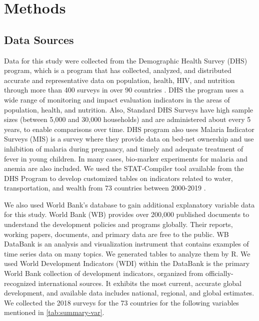 \documentclass[10pt,twoside]{article}
\numberwithin{equation}{section}
\newcommand{\?}{\stackrel{?}{=}}
\begin{document}
\section{Methods}
\subsection{Data Sources}
Data for this study were collected from the Demographic Health Survey (DHS) program, which is a program that has collected, analyzed, and distributed accurate and representative data on population, health, HIV, and nutrition through more than 400 surveys in over 90 countries \citep{statcompiler}. DHS the program uses a wide range of monitoring and impact evaluation indicators in the areas of population, health, and nutrition. Also, Standard DHS Surveys have high sample sizes (between 5,000 and 30,000 households) and are administered about every 5 years, to enable comparisons over time. DHS program also uses Malaria Indicator Surveys (MIS) is a survey where they provide data on bed-net ownership and use inhibition of malaria during pregnancy, and timely and adequate treatment of fever in young children. In many cases, bio-marker experiments for malaria and anemia are also included. We used the STAT-Compiler tool available from the DHS Program to develop customized tables on indicators related to water, transportation, and wealth from 73 countries between 2000-2019 \citep{statcompiler}.

We also used World Bank's database to gain additional explanatory variable data for this study. World Bank (WB) provides over 200,000 published documents to understand the development policies and programs globally. Their reports, working papers, documents, and primary data are free to the public. WB DataBank is an analysis and visualization instrument that contains examples of time series data on many topics. We generated tables to analyze them by R.  We used World Development Indicators (WDI) within the DataBank is the primary World Bank collection of development indicators, organized from officially-recognized international sources. It exhibits the most current, accurate global development, and available data includes national, regional, and global estimates. We collected the 2018 surveys for the 73 countries for the following variables mentioned in \autoref{tab:summary-var}. 
\end{document}
